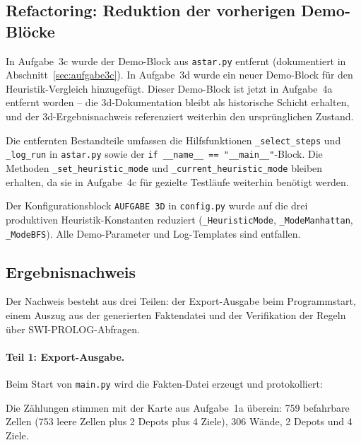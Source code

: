 \subsection{Refactoring: Reduktion der vorherigen Demo-Blöcke}

In Aufgabe~3c wurde der Demo-Block aus \texttt{astar.py} entfernt (dokumentiert in Abschnitt~\ref{sec:aufgabe3c}). In Aufgabe~3d wurde ein neuer Demo-Block für den Heuristik-Vergleich hinzugefügt. Dieser Demo-Block ist jetzt in Aufgabe~4a entfernt worden -- die 3d-Dokumentation bleibt als historische Schicht erhalten, und der 3d-Ergebnisnachweis referenziert weiterhin den ursprünglichen Zustand.

Die entfernten Bestandteile umfassen die Hilfsfunktionen \texttt{\_select\_steps} und \texttt{\_log\_run} in \texttt{astar.py} sowie der \texttt{if \_\_name\_\_ == "\_\_main\_\_"}-Block. Die Methoden \texttt{\_set\_heuristic\_mode} und \texttt{\_current\_heuristic\_mode} bleiben erhalten, da sie in Aufgabe~4c für gezielte Testläufe weiterhin benötigt werden.

Der Konfigurationsblock \texttt{AUFGABE 3D} in \texttt{config.py} wurde auf die drei produktiven Heuristik-Konstanten reduziert (\texttt{\_HeuristicMode}, \texttt{\_ModeManhattan}, \texttt{\_ModeBFS}). Alle Demo-Parameter und Log-Templates sind entfallen.


\subsection{Ergebnisnachweis}
\label{sssec:prolog_4a_nachweis}

Der Nachweis besteht aus drei Teilen: der Export-Ausgabe beim Programmstart, einem Auszug aus der generierten Faktendatei und der Verifikation der Regeln über \acs{SWI}-\acs{PROLOG}-Abfragen.

\paragraph{Teil 1: Export-Ausgabe.}
Beim Start von \texttt{main.py} wird die Fakten-Datei erzeugt und protokolliert:



Die Zählungen stimmen mit der Karte aus Aufgabe~1a überein: 759 befahrbare Zellen (753 leere Zellen plus 2 Depots plus 4 Ziele), 306 Wände, 2 Depots und 4 Ziele.

